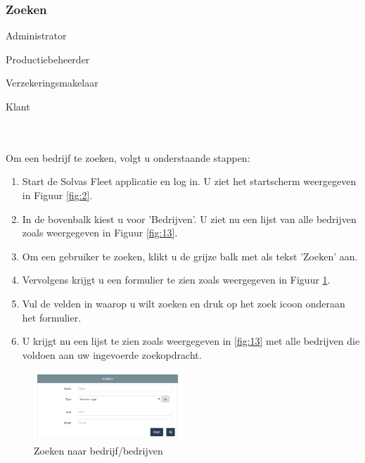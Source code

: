 \documentclass[11pt,openany]{article}
\newcommand{\cmark}{\ding{51}}%
\newcommand{\done}{\rlap{$\square$}{\raisebox{2pt}{\large\hspace{1pt}\cmark}}%
	\hspace{-2.5pt}}
\begin{document}
\subsubsection{Zoeken}
\begin{todolist}
	\item[\done] Administrator
	\item[\done] Productiebeheerder
	\item[\done] Verzekeringsmakelaar
	\item[\done] Klant 
\end{todolist}
\\
\\
Om een bedrijf te zoeken, volgt u onderstaande stappen:
\begin{enumerate}
	\item Start de Solvas Fleet applicatie en log in. U ziet het startscherm weergegeven in Figuur \ref{fig:2}.
	\item In de bovenbalk kiest u voor 'Bedrijven'. U ziet nu een lijst van alle bedrijven zoals weergegeven in Figuur \ref{fig:13}.
	\item Om een gebruiker te zoeken, klikt u de grijze balk met als tekst 'Zoeken' aan.
	\item Vervolgens krijgt u een formulier te zien zoals weergegeven in Figuur \ref{fig:17}.
	\item Vul de velden in waarop u wilt zoeken en druk op het zoek icoon onderaan het formulier.
	\item U krijgt nu een lijst te zien zoals weergegeven in \ref{fig:13} met alle bedrijven die voldoen aan uw ingevoerde zoekopdracht.
\end{enumerate}


\begin{figure}
	\centering
	\includegraphics[width=0.5\textwidth]{img/fig17.png}
	\caption{Zoeken naar bedrijf/bedrijven} 
	\label{fig:17} 
\end{figure}
\end{document}
